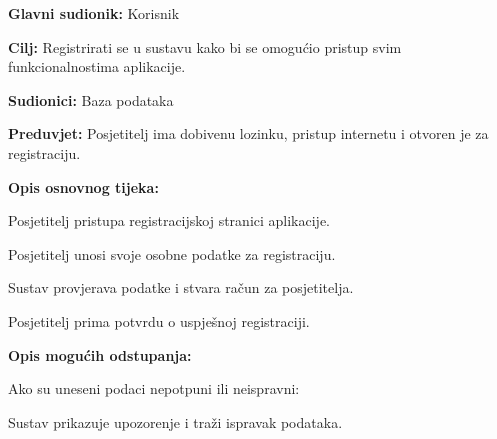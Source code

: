 					\noindent {}
					\begin{packed_item}
						
						\item \textbf{Glavni sudionik: }Korisnik
						\item  \textbf{Cilj:} Registrirati se u sustavu kako bi se omogućio pristup svim funkcionalnostima aplikacije.
						\item  \textbf{Sudionici:} Baza podataka
						\item  \textbf{Preduvjet:} Posjetitelj ima dobivenu lozinku, pristup internetu i otvoren je za registraciju.
						\item  \textbf{Opis osnovnog tijeka:}
						
						\item[] \begin{packed_enum}
							
							\item Posjetitelj pristupa registracijskoj stranici aplikacije.
							\item Posjetitelj unosi svoje osobne podatke za registraciju.
							\item Sustav provjerava podatke i stvara račun za posjetitelja.
							\item Posjetitelj prima potvrdu o uspješnoj registraciji.
						\end{packed_enum}
						
						\item  \textbf{Opis mogućih odstupanja:}
						
						\item[] \begin{packed_item}
							
							\item[3.a] Ako su uneseni podaci nepotpuni ili neispravni:
							\item[] \begin{packed_enum}
								
								\item Sustav prikazuje upozorenje i traži ispravak podataka.
								
							\end{packed_enum}
						\end{packed_item}
					\end{packed_item}
					
